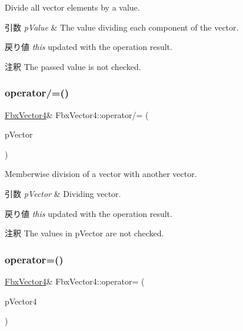 Divide all vector elements by a value. 
\begin{DoxyParams}{引数}
{\em p\+Value} & The value dividing each component of the vector. \\
\hline
\end{DoxyParams}
\begin{DoxyReturn}{戻り値}
{\itshape this} updated with the operation result. 
\end{DoxyReturn}
\begin{DoxyRemark}{注釈}
The passed value is not checked. 
\end{DoxyRemark}
\mbox{\label{class_fbx_vector4_a949819573b3bcb8b8fa1185c81aa6671}} 
\subsubsection{\texorpdfstring{operator/=()}{operator/=()}\hspace{0.1cm}{\footnotesize\ttfamily [2/2]}}
{\footnotesize\ttfamily \hyperlink{class_fbx_vector4}{Fbx\+Vector4}\& Fbx\+Vector4\+::operator/= (\begin{DoxyParamCaption}\item[{const \hyperlink{class_fbx_vector4}{Fbx\+Vector4} \&}]{p\+Vector }\end{DoxyParamCaption})}

Memberwise division of a vector with another vector. 
\begin{DoxyParams}{引数}
{\em p\+Vector} & Dividing vector. \\
\hline
\end{DoxyParams}
\begin{DoxyReturn}{戻り値}
{\itshape this} updated with the operation result. 
\end{DoxyReturn}
\begin{DoxyRemark}{注釈}
The values in p\+Vector are not checked. 
\end{DoxyRemark}
\mbox{\label{class_fbx_vector4_a0080c936a55f46673fe7cbbb0d405f7b}} 
\subsubsection{\texorpdfstring{operator=()}{operator=()}\hspace{0.1cm}{\footnotesize\ttfamily [1/3]}}
{\footnotesize\ttfamily \hyperlink{class_fbx_vector4}{Fbx\+Vector4}\& Fbx\+Vector4\+::operator= (\begin{DoxyParamCaption}\item[{const \hyperlink{class_fbx_vector4}{Fbx\+Vector4} \&}]{p\+Vector4 }\end{DoxyParamCaption})}

